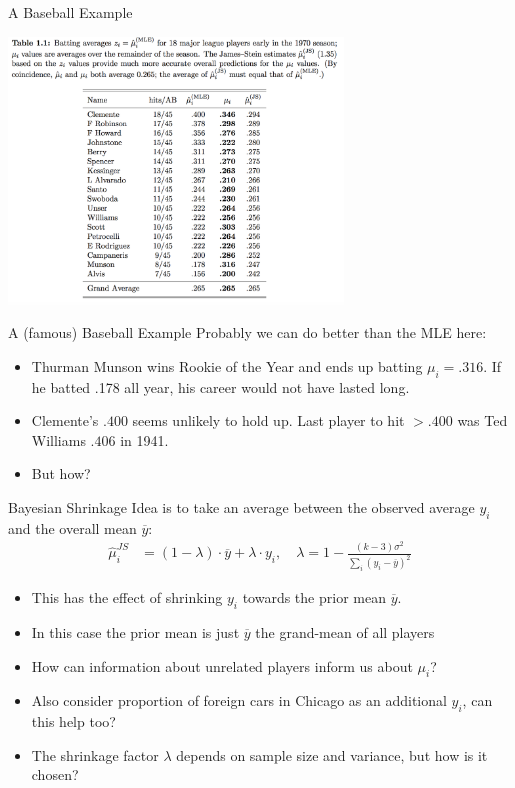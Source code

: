 \documentclass[xcolor=pdftex,dvipsnames,table,mathserif,aspectratio=169]{beamer}
\begin{document}
\begin{frame}[fragile]{A Baseball Example}
\begin{center}
\includegraphics[width=3.5in]{./resources/baseball.png}
\end{center}
\end{frame}

\begin{frame}[fragile]{A (famous) Baseball Example}
Probably we can do better than the MLE here:
\begin{itemize}
\item Thurman Munson wins Rookie of the Year and ends up batting $\mu_i = .316$. If he batted .178 all year, his career would not have lasted long.
\item Clemente's $.400$ seems unlikely to hold up. Last player to hit $> .400$ was Ted Williams $.406$ in 1941.
\item But how?
\end{itemize}
\end{frame}

\begin{frame}[fragile]{Bayesian Shrinkage}
Idea is to take an average between the observed average $y_i$ and the overall mean $\overline{y}$:
\begin{align*}
\widehat{\mu}_i^{JS} &=  (1-\lambda) \cdot \overline{y}  + \lambda \cdot y_i, \quad
\lambda = 1 - \frac{(k-3) \sigma^2}{\sum_i( y_i - \overline{y})^2}
\end{align*}
\begin{itemize}
\item This has the effect of \alert{shrinking} $y_i$ towards the \alert{prior mean} $\overline{y}$.
\item In this case the \alert{prior mean} is just $\overline{y}$ the grand-mean of all players
\item How can information about unrelated players inform us about $\mu_i$?
\item Also consider proportion of foreign cars in Chicago as an additional $y_i$, can this help too?
\item The \alert{shrinkage factor} $\lambda$ depends on sample size and variance, but how is it chosen?
\end{itemize}
\end{frame}
\end{document}
